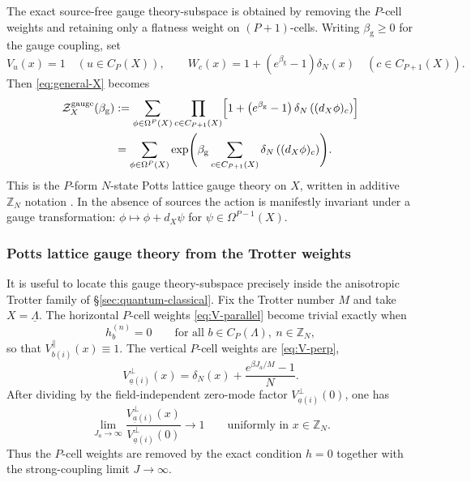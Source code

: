 \documentclass[dvipsnames,a4paper]{article}
\numberwithin{equation}{section}
\theoremstyle{definition}
\theoremstyle{remark}
\begin{document}
The exact source-free gauge theory-subspace is obtained by removing the \(P\)-cell
weights and retaining only a flatness weight on \((P+1)\)-cells. Writing
\(\beta_{\mathrm g}\ge 0\) for the gauge coupling, set
\begin{equation}
	V_u(x)=1
	\quad (u\in C_P(X)),
	\qquad
	W_c(x)=1+\left(e^{\beta_{\mathrm g}}-1\right)\delta_N(x)
	\quad (c\in C_{P+1}(X)).
	\label{eq:gauge-weights}
\end{equation}
Then \eqref{eq:general-X} becomes
\begin{align}
	\mathcal Z_X^{\mathrm{gauge}}(\beta_{\mathrm g})
	&:=
	\sum_{\phi\in \Omega^P(X)}
	\prod_{c\in C_{P+1}(X)}
	\Bigl[
	1+\left(e^{\beta_{\mathrm g}}-1\right)\delta_N\left((d_X\phi)_c\right)
	\Bigr]
	\nonumber\\
	&=
	\sum_{\phi\in \Omega^P(X)}
	\exp\Biggl(
	\beta_{\mathrm g}
	\sum_{c\in C_{P+1}(X)}
	\delta_N\left((d_X\phi)_c\right)
	\Biggr).
	\label{eq:gauge-partition}
\end{align}
This is the \(P\)-form \(N\)-state Potts lattice gauge theory on \(X\), written
in additive \(\mathbb Z_N\) notation
\cite{Wegner:1971app,FradkinShenker1979,BanksRabinovici1979,
	HiraokaShirai2016,DuncanSchweinhartTopological,
	DuncanSchweinhartDeconfinement}. In the absence of sources the action is manifestly invariant under a gauge transformation: $\phi \mapsto \phi + d_X\psi$ for $\psi \in \Omega^{P-1}(X)$.


\subsubsection{Potts lattice gauge theory from the Trotter weights}
It is useful to locate this gauge theory-subspace precisely inside the anisotropic
Trotter family of \S\ref{sec:quantum-classical}. Fix the Trotter number \(M\)
and take \(X=\underline\Lambda\). The horizontal \(P\)-cell weights
\eqref{eq:V-parallel} become trivial exactly when
\begin{equation}
	h_b^{(n)}=0
	\qquad
	\text{for all }b\in C_P(\Lambda),\ n\in\mathbb Z_N,
\end{equation}
so that \(V_{b(i)}^{\parallel}(x)\equiv 1\). The vertical \(P\)-cell weights are
\eqref{eq:V-perp},
\begin{equation}
	V_{\underline a(i)}^{\perp}(x)
	=
	\delta_N(x)+\frac{e^{\beta J_a/M}-1}{N}.
\end{equation}
After dividing by the field-independent zero-mode factor
\(V_{\underline a(i)}^{\perp}(0)\), one has
\begin{equation}
	\lim_{J_a\to\infty}
	\frac{V_{\underline a(i)}^{\perp}(x)}{V_{\underline a(i)}^{\perp}(0)}
	\to 1
	\qquad
	\text{uniformly in }x\in\mathbb Z_N.
\end{equation}
Thus the \(P\)-cell weights are removed by the exact condition \(h=0\) together
with the strong-coupling limit \(J\to\infty\).
\end{document}
